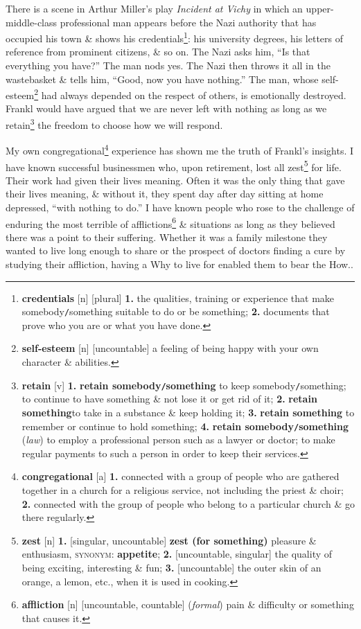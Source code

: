 \documentclass[oneside]{book}
\numberwithin{equation}{section}
\begin{document}
There is a scene in Arthur Miller's play \textit{Incident at Vichy} in which an upper-middle-class professional man appears before the Nazi authority that has occupied his town \& shows his credentials\footnote{\textbf{credentials} [n] [plural] \textbf{1.} the qualities, training or experience that make somebody\texttt{/}something suitable to do or be something; \textbf{2.} documents that prove who you are or what you have done.}: his university degrees, his letters of reference from prominent citizens, \& so on. The Nazi asks him, ``Is that everything you have?'' The man nods yes. The Nazi then throws it all in the wastebasket \& tells him, ``Good, now you have nothing.'' The man, whose self-esteem\footnote{\textbf{self-esteem} [n] [uncountable] a feeling of being happy with your own character \& abilities.} had always depended on the respect of others, is emotionally destroyed. Frankl would have argued that we are never left with nothing as long as we retain\footnote{\textbf{retain} [v] \textbf{1.} \textbf{retain somebody\texttt{/}something} to keep somebody\texttt{/}something; to continue to have something \& not lose it or get rid of it; \textbf{2.} \textbf{retain something}to take in a substance \& keep holding it; \textbf{3.} \textbf{retain something} to remember or continue to hold something; \textbf{4.} \textbf{retain somebody\texttt{/}something} (\textit{law}) to employ a professional person such as a lawyer or doctor; to make regular payments to such a person in order to keep their services.} the freedom to choose how we will respond.

My own congregational\footnote{\textbf{congregational} [a] \textbf{1.} connected with a group of people who are gathered together in a church for a religious service, not including the priest \& choir; \textbf{2.} connected with the group of people who belong to a particular church \& go there regularly.} experience has shown me the truth of Frankl's insights. I have known successful businessmen who, upon retirement, lost all zest\footnote{\textbf{zest} [n] \textbf{1.} [singular, uncountable] \textbf{zest (for something)} pleasure \& enthusiasm, \textsc{synonym}: \textbf{appetite}; \textbf{2.} [uncountable, singular] the quality of being exciting, interesting \& fun; \textbf{3.} [uncountable] the outer skin of an orange, a lemon, etc., when it is used in cooking.} for life. Their work had given their lives meaning. Often it was the only thing that gave their lives meaning, \& without it, they spent day after day sitting at home depressed, ``with nothing to do.'' I have known people who rose to the challenge of enduring the most terrible of afflictions\footnote{\textbf{affliction} [n] [uncountable, countable] (\textit{formal}) pain \& difficulty or something that causes it.} \& situations as long as they believed there was a point to their suffering. Whether it was a family milestone they wanted to live long enough to share or the prospect of doctors finding a cure by studying their affliction, having a Why to live for enabled them to bear the How..
\end{document}
